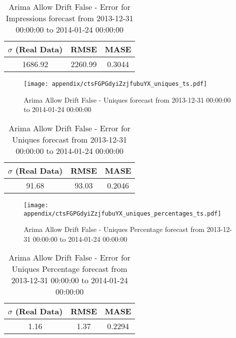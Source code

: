 \begin{table}[H]
\centering
\footnotesize
\begin{tabular}{ccc}
$\sigma$ (Real Data) & RMSE & MASE   \\ \hline
1686.92 & 2260.99 & 0.3044 \\
\end{tabular}

\vspace{0.5cm}

\caption[]{
Arima Allow Drift False - Error for Impressions forecast from 2013-12-31 00:00:00 to 2014-01-24 00:00:00}
\end{table}

\begin{figure}[H] \begin{center} \leavevmode
\texttt{[image: appendix/ctsFGPGdyiZzjfubuYX\_uniques\_ts.pdf]} \caption[]{
Arima Allow Drift False - Uniques forecast from 2013-12-31 00:00:00 to 2014-01-24 00:00:00} \label{fig:appendix/ctsFGPGdyiZzjfubuYX_uniques_ts.pdf} \end{center}
\end{figure}

\begin{table}[H]
\centering
\footnotesize
\begin{tabular}{ccc}
$\sigma$ (Real Data) & RMSE & MASE   \\ \hline
91.68 & 93.03 & 0.2046 \\
\end{tabular}

\vspace{0.5cm}

\caption[]{
Arima Allow Drift False - Error for Uniques forecast from 2013-12-31 00:00:00 to 2014-01-24 00:00:00}
\end{table}

\begin{figure}[H] \begin{center} \leavevmode
\texttt{[image: appendix/ctsFGPGdyiZzjfubuYX\_uniques\_percentages\_ts.pdf]} \caption[]{
Arima Allow Drift False - Uniques Percentage forecast from 2013-12-31 00:00:00 to 2014-01-24 00:00:00} \label{fig:appendix/ctsFGPGdyiZzjfubuYX_uniques_percentages_ts.pdf} \end{center}
\end{figure}

\begin{table}[H]
\centering
\footnotesize
\begin{tabular}{ccc}
$\sigma$ (Real Data) & RMSE & MASE   \\ \hline
1.16 & 1.37 & 0.2294 \\
\end{tabular}

\vspace{0.5cm}

\caption[]{
Arima Allow Drift False - Error for Uniques Percentage forecast from 2013-12-31 00:00:00 to 2014-01-24 00:00:00}
\end{table}

